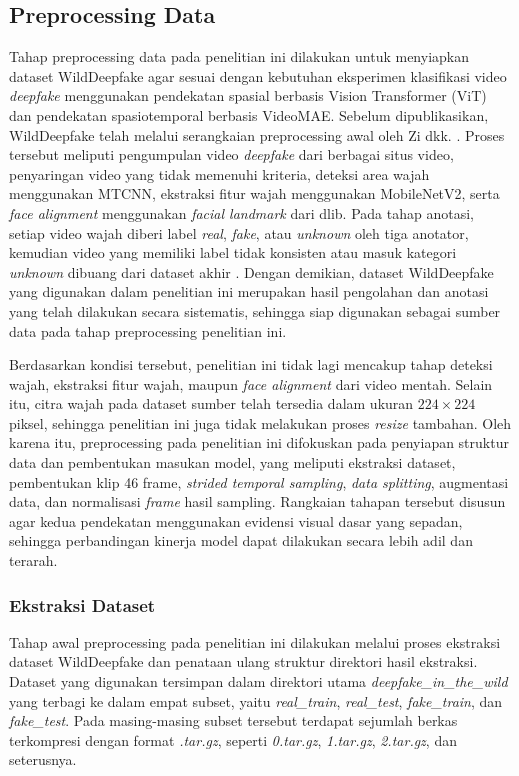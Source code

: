 \subsection{Preprocessing Data} \label{III.Preprocessing Data}
Tahap preprocessing data pada penelitian ini dilakukan untuk menyiapkan dataset WildDeepfake agar sesuai dengan kebutuhan eksperimen klasifikasi video \textit{deepfake} menggunakan pendekatan spasial berbasis Vision Transformer (ViT) dan pendekatan spasiotemporal berbasis VideoMAE. Sebelum dipublikasikan, WildDeepfake telah melalui serangkaian preprocessing awal oleh Zi dkk. \cite{Zi2024}. Proses tersebut meliputi pengumpulan video \textit{deepfake} dari berbagai situs video, penyaringan video yang tidak memenuhi kriteria, deteksi area wajah menggunakan MTCNN, ekstraksi fitur wajah menggunakan MobileNetV2, serta \textit{face alignment} menggunakan \textit{facial landmark} dari dlib. Pada tahap anotasi, setiap video wajah diberi label \textit{real}, \textit{fake}, atau \textit{unknown} oleh tiga anotator, kemudian video yang memiliki label tidak konsisten atau masuk kategori \textit{unknown} dibuang dari dataset akhir \cite{Zi2024}. Dengan demikian, dataset WildDeepfake yang digunakan dalam penelitian ini merupakan hasil pengolahan dan anotasi yang telah dilakukan secara sistematis, sehingga siap digunakan sebagai sumber data pada tahap preprocessing penelitian ini. \par

Berdasarkan kondisi tersebut, penelitian ini tidak lagi mencakup tahap deteksi wajah, ekstraksi fitur wajah, maupun \textit{face alignment} dari video mentah. Selain itu, citra wajah pada dataset sumber telah tersedia dalam ukuran $224 \times 224$ piksel, sehingga penelitian ini juga tidak melakukan proses \textit{resize} tambahan. Oleh karena itu, preprocessing pada penelitian ini difokuskan pada penyiapan struktur data dan pembentukan masukan model, yang meliputi ekstraksi dataset, pembentukan klip 46 frame, \textit{strided temporal sampling}, \textit{data splitting}, augmentasi data, dan normalisasi \textit{frame} hasil sampling. Rangkaian tahapan tersebut disusun agar kedua pendekatan menggunakan evidensi visual dasar yang sepadan, sehingga perbandingan kinerja model dapat dilakukan secara lebih adil dan terarah. \par

\subsubsection{Ekstraksi Dataset}
Tahap awal preprocessing pada penelitian ini dilakukan melalui proses ekstraksi dataset WildDeepfake dan penataan ulang struktur direktori hasil ekstraksi. Dataset yang digunakan tersimpan dalam direktori utama \textit{deepfake\_in\_the\_wild} yang terbagi ke dalam empat subset, yaitu \textit{real\_train}, \textit{real\_test}, \textit{fake\_train}, dan \textit{fake\_test}. Pada masing-masing subset tersebut terdapat sejumlah berkas terkompresi dengan format \textit{.tar.gz}, seperti \textit{0.tar.gz}, \textit{1.tar.gz}, \textit{2.tar.gz}, dan seterusnya. \par

